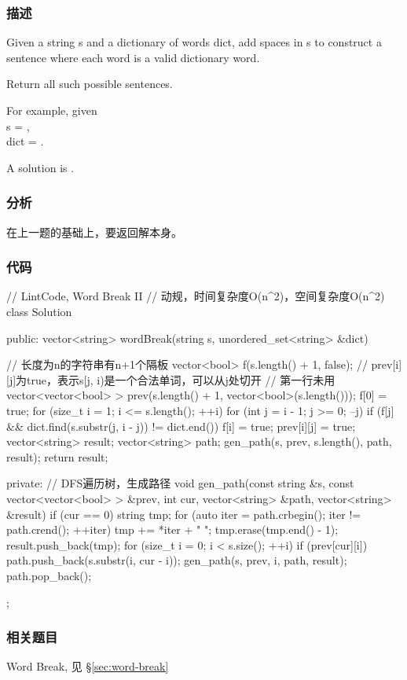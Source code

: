 \subsubsection{描述}
Given a string s and a dictionary of words dict, add spaces in s to construct a sentence where each word is a valid dictionary word.

Return all such possible sentences.

For example, given  \\
s = , \\
dict = .

A solution is .


\subsubsection{分析}
在上一题的基础上，要返回解本身。


\subsubsection{代码}
\begin{Code}
// LintCode, Word Break II
// 动规，时间复杂度O(n^2)，空间复杂度O(n^2)
class Solution {
public:
    vector<string> wordBreak(string s, unordered_set<string> &dict) {
        // 长度为n的字符串有n+1个隔板
        vector<bool> f(s.length() + 1, false);
        // prev[i][j]为true，表示s[j, i)是一个合法单词，可以从j处切开
        // 第一行未用
        vector<vector<bool> > prev(s.length() + 1, vector<bool>(s.length()));
        f[0] = true;
        for (size_t i = 1; i <= s.length(); ++i) {
            for (int j = i - 1; j >= 0; --j) {
                if (f[j] && dict.find(s.substr(j, i - j)) != dict.end()) {
                    f[i] = true;
                    prev[i][j] = true;
                }
            }
        }
        vector<string> result;
        vector<string> path;
        gen_path(s, prev, s.length(), path, result);
        return result;

    }
private:
    // DFS遍历树，生成路径
    void gen_path(const string &s, const vector<vector<bool> > &prev,
            int cur, vector<string> &path, vector<string> &result) {
        if (cur == 0) {
            string tmp;
            for (auto iter = path.crbegin(); iter != path.crend(); ++iter)
                tmp += *iter + " ";
            tmp.erase(tmp.end() - 1);
            result.push_back(tmp);
        }
        for (size_t i = 0; i < s.size(); ++i) {
            if (prev[cur][i]) {
                path.push_back(s.substr(i, cur - i));
                gen_path(s, prev, i, path, result);
                path.pop_back();
            }
        }
    }
};
\end{Code}


\subsubsection{相关题目}
\begindot
\item Word Break, 见 \S \ref{sec:word-break}
\myenddot
